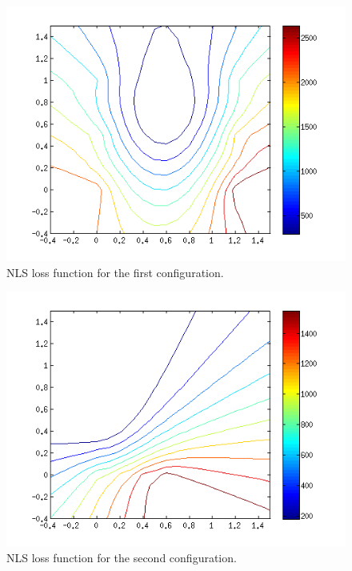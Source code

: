 \documentclass[10pt,a4paper]{report}
\begin{document}
\begin{figure}[H]
\begin{center}
  \includegraphics[width = 350pt]{nls_good.png}
  \caption{NLS loss function for the first configuration.}
  \label{nls_good}
  \end{center}
\end{figure}

\begin{figure}[H]
\begin{center}
  \includegraphics[width = 350pt]{nls_bad.png}
  \caption{NLS loss function for the second configuration.}
  \label{nls_bad}
  \end{center}
\end{figure}
\end{document}

